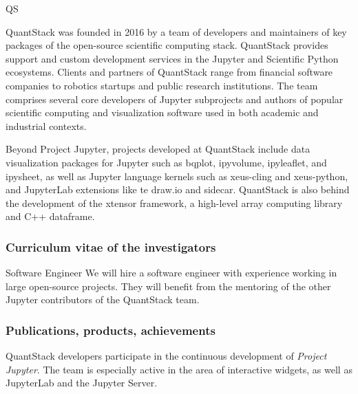 \begin{sitedescription}{QS}

\par QuantStack was founded in 2016 by a team of developers and maintainers of key packages of the open-source scientific computing stack. QuantStack provides support and custom development services in the Jupyter and Scientific Python ecosystems. Clients and partners of QuantStack range from financial software companies to robotics startups and public research institutions. The team comprises several core developers of Jupyter subprojects and authors of popular scientific computing and visualization software used in both academic and industrial contexts.

\par Beyond Project Jupyter, projects developed at QuantStack include data visualization packages for Jupyter such as bqplot, ipyvolume, ipyleaflet, and ipysheet, as well as Jupyter language kernels such as xeus-cling and xeus-python, and JupyterLab extensions like te draw.io and sidecar. QuantStack is also behind the development of the xtensor framework, a high-level array computing library and C++ dataframe.

\subsubsection*{Curriculum vitae of the investigators}






\begin{participant}[type=R,PM=41,salary=7000]{Software Engineer} %
  We will hire a software engineer with experience working in large open-source
  projects. They will benefit from the mentoring of the other Jupyter contributors
  of the QuantStack team.
\end{participant}

\subsubsection*{Publications, products, achievements}

\begin{compactenum}

\item QuantStack developers participate in the continuous development of \emph{Project Jupyter}. The team is especially active in the area of interactive widgets, as well as JupyterLab and the Jupyter Server.


\end{compactenum}
\end{sitedescription}

